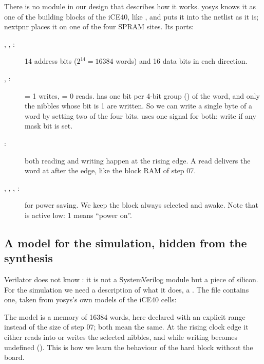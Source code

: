 
There is no module  in our design that describes how it
works. yosys knows it as one of the building blocks of the iCE40, like
, and puts it into the netlist as it is; nextpnr places it on one of
the four SPRAM sites. Its ports:
\begin{description}
\item[, , :] 14 address bits ($2^{14} =
  16384$ words) and 16 data bits in each direction.
\item[, :]  = 1 writes,  = 0 reads.
   has one bit per 4-bit group () of the word, and
  only the nibbles whose bit is 1 are written. So we can write a single byte of
  a word by setting two of the four bits.  uses one signal
   for both: write if any mask bit is set.
\item[:] both reading and writing happen at the rising edge. A read
  delivers the word at  after the edge, like the block RAM of step
  07.
\item[, , , :] for power
  saving. We keep the block always selected and awake. Note that
   is active low: 1 means ``power on''.
\end{description}

\subsection*{A model for the simulation, hidden from the synthesis}

Verilator does not know : it is not a SystemVerilog module
but a piece of silicon. For the simulation we need a description of what it
does, a . The file  contains one,
taken from yosys's own models of the iCE40 cells:


The model is a memory  of 16384 words, here declared with an explicit
range \cc{[0:16383]} instead of the size \cc{[DEPTH]} of step 07; both mean
the same. At the rising clock edge it either reads into  or writes
the selected nibbles, and while writing  becomes undefined
(). This is how we learn the behaviour of the hard block without the
board.

